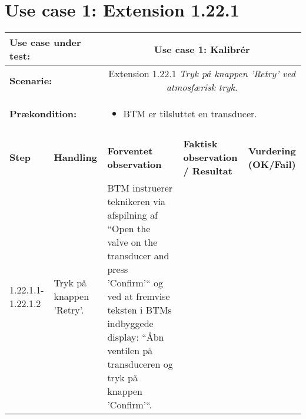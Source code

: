\section{Use case 1: Extension 1.22.1}
\begin{tabular}{|p{1.5cm}|p{3cm}|p{4cm}|p{4cm}|p{2cm}|}
\hline
\multicolumn{2}{|p{3cm}|}{\textbf{Use case under test:}} & \multicolumn{3}{c|}{Use case 1: Kalibrér } \\\hline

\multicolumn{2}{|p{3cm}|}{\textbf{Scenarie:}} & \multicolumn{3}{c|}{Extension 1.22.1 \textit{Tryk på knappen 'Retry' ved atmosfærisk tryk.}} \\\hline
\multicolumn{2}{|p{3cm}|}{\textbf{Prækondition:}}  & \multicolumn{3}{l|}{\parbox{0.6\textwidth}{
\begin{itemize}[label=$\circ$]
\item BTM er tilsluttet en transducer. 
\end{itemize} }}\\\hline

\multicolumn{5}{|c|}{} \\\hline

\textbf{Step} & \textbf{Handling} & \textbf{Forventet observation} & \textbf{Faktisk observation / Resultat} & \textbf{Vurdering (OK/Fail)}\\\hline

1.22.1.1-1.22.1.2 & Tryk på knappen 'Retry'. & BTM instruerer teknikeren via afspilning af “Open
the valve on the transducer and press ’Confirm’“ og
ved at fremvise teksten i BTMs indbyggede display:
“Åbn ventilen på transduceren og tryk på knappen
’Confirm’“. & & \\\hline

\end{tabular}


